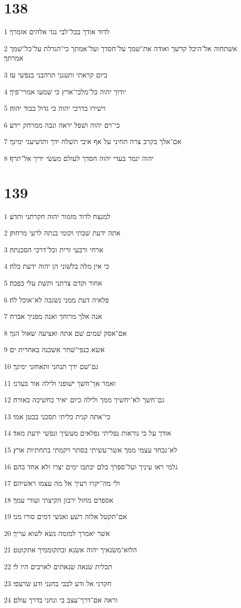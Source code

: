 \chapter{138}

\par 1 לדוד אודך בכל־לבי נגד אלהים אזמרך׃
\par 2 אשׁתחוה אל־היכל קדשׁך ואודה את־שׁמך על־חסדך ועל־אמתך כי־הגדלת על־כל־שׁמך אמרתך׃
\par 3 ביום קראתי ותענני תרהבני בנפשׁי עז׃
\par 4 יודוך יהוה כל־מלכי־ארץ כי שׁמעו אמרי־פיך׃
\par 5 וישׁירו בדרכי יהוה כי גדול כבוד יהוה׃
\par 6 כי־רם יהוה ושׁפל יראה וגבה ממרחק יידע׃
\par 7 אם־אלך בקרב צרה תחיני על אף איבי תשׁלח ידך ותושׁיעני ימינך׃
\par 8 יהוה יגמר בעדי יהוה חסדך לעולם מעשׂי ידיך אל־תרף׃

\chapter{139}

\par 1 למנצח לדוד מזמור יהוה חקרתני ותדע׃
\par 2 אתה ידעת שׁבתי וקומי בנתה לרעי מרחוק׃
\par 3 ארחי ורבעי זרית וכל־דרכי הסכנתה׃
\par 4 כי אין מלה בלשׁוני הן יהוה ידעת כלה׃
\par 5 אחור וקדם צרתני ותשׁת עלי כפכה׃
\par 6 פלאיה דעת ממני נשׂגבה לא־אוכל לה׃
\par 7 אנה אלך מרוחך ואנה מפניך אברח׃
\par 8 אם־אסק שׁמים שׁם אתה ואציעה שׁאול הנך׃
\par 9 אשׂא כנפי־שׁחר אשׁכנה באחרית ים׃
\par 10 גם־שׁם ידך תנחני ותאחזני ימינך׃
\par 11 ואמר אך־חשׁך ישׁופני ולילה אור בעדני׃
\par 12 גם־חשׁך לא־יחשׁיך ממך ולילה כיום יאיר כחשׁיכה כאורה׃
\par 13 כי־אתה קנית כליתי תסכני בבטן אמי׃
\par 14 אודך על כי נוראות נפליתי נפלאים מעשׂיך ונפשׁי ידעת מאד׃
\par 15 לא־נכחד עצמי ממך אשׁר־עשׂיתי בסתר רקמתי בתחתיות ארץ׃
\par 16 גלמי ראו עיניך ועל־ספרך כלם יכתבו ימים יצרו ולא אחד בהם׃
\par 17 ולי מה־יקרו רעיך אל מה עצמו ראשׁיהם׃
\par 18 אספרם מחול ירבון הקיצתי ועודי עמך׃
\par 19 אם־תקטל אלוה רשׁע ואנשׁי דמים סורו מני׃
\par 20 אשׁר יאמרך למזמה נשׂא לשׁוא עריך׃
\par 21 הלוא־משׂנאיך יהוה אשׂנא ובתקוממיך אתקוטט׃
\par 22 תכלית שׂנאה שׂנאתים לאויבים היו לי׃
\par 23 חקרני אל ודע לבבי בחנני ודע שׂרעפי׃
\par 24 וראה אם־דרך־עצב בי ונחני בדרך עולם׃

